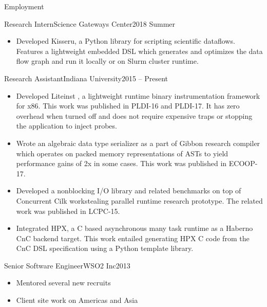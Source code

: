 \documentclass[calibri]{mcdowellcv}
\begin{document}
	\makeheader
	
	\begin{cvsection}{Employment}
		\begin{cvsubsection}{Research Intern}{Science Gateways Center}{2018 Summer} 
			\begin{itemize}
			  \item Developed Kisseru, a Python library for scripting scientific dataflows. Features a lightweight
				  embedded DSL which generates and optimizes the data flow graph and run it locally or on Slurm cluster
				  runtime.
			\end{itemize}
		\end{cvsubsection}


		\begin{cvsubsection}{Research Assistant}{Indiana University}{2015 -- Present}			
			\begin{itemize}
				\item Developed Liteinst , a lightweight runtime binary instrumentation framework
for x86. This work was published in PLDI-16 and PLDI-17. It has zero overhead when turned off and does not require expensive traps or stopping the application to inject probes.
				\item Wrote an algebraic data type serializer as a part of Gibbon research compiler which operates on packed memory representations of ASTs to yield performance gains of 2x in some cases. This work was published in ECOOP-17.
				\item Developed a nonblocking I/O library and related benchmarks on top of Concurrent Cilk workstealing parallel runtime research prototype. The related work was published in LCPC-15.
				\item Integrated HPX, a C based asynchronous many task runtime as a Haberno CnC backend target. This work entailed generating HPX C code from the CnC DSL specification using a Python template library.
			\end{itemize}
		\end{cvsubsection}
		
		\begin{cvsubsection}{Senior Software Engineer}{WSO2 Inc}{2013}	
		\begin{itemize}
		\item Mentored several new recruits
		\item Client site work on Americas and Asia
		\end{itemize}
		\end{cvsubsection}
		

\end{cvsection}
\end{document}
